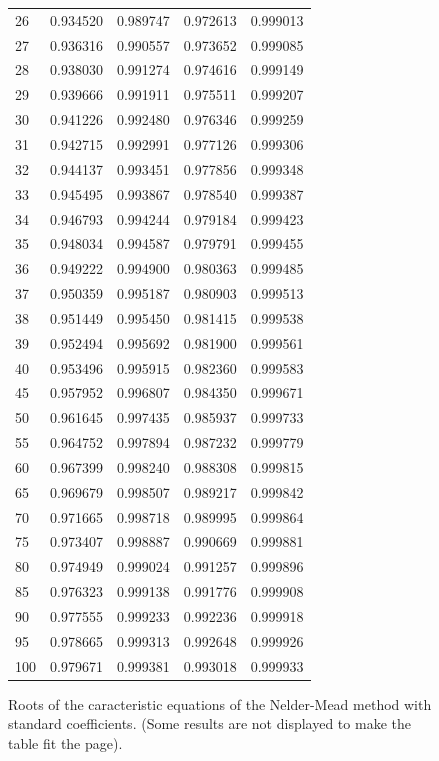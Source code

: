 \begin{figure}[htbp]
\begin{center}
\begin{tiny}
\begin{tabular}{|l|l||l|l|l|}
26 & 0.934520 & 0.989747 & 0.972613 & 0.999013\\
27 & 0.936316 & 0.990557 & 0.973652 & 0.999085\\
28 & 0.938030 & 0.991274 & 0.974616 & 0.999149\\
29 & 0.939666 & 0.991911 & 0.975511 & 0.999207\\
30 & 0.941226 & 0.992480 & 0.976346 & 0.999259\\
31 & 0.942715 & 0.992991 & 0.977126 & 0.999306\\
32 & 0.944137 & 0.993451 & 0.977856 & 0.999348\\
33 & 0.945495 & 0.993867 & 0.978540 & 0.999387\\
34 & 0.946793 & 0.994244 & 0.979184 & 0.999423\\
35 & 0.948034 & 0.994587 & 0.979791 & 0.999455\\
36 & 0.949222 & 0.994900 & 0.980363 & 0.999485\\
37 & 0.950359 & 0.995187 & 0.980903 & 0.999513\\
38 & 0.951449 & 0.995450 & 0.981415 & 0.999538\\
39 & 0.952494 & 0.995692 & 0.981900 & 0.999561\\
40 & 0.953496 & 0.995915 & 0.982360 & 0.999583\\
45 & 0.957952 & 0.996807 & 0.984350 & 0.999671\\
50 & 0.961645 & 0.997435 & 0.985937 & 0.999733\\
55 & 0.964752 & 0.997894 & 0.987232 & 0.999779\\
60 & 0.967399 & 0.998240 & 0.988308 & 0.999815\\
65 & 0.969679 & 0.998507 & 0.989217 & 0.999842\\
70 & 0.971665 & 0.998718 & 0.989995 & 0.999864\\
75 & 0.973407 & 0.998887 & 0.990669 & 0.999881\\
80 & 0.974949 & 0.999024 & 0.991257 & 0.999896\\
85 & 0.976323 & 0.999138 & 0.991776 & 0.999908\\
90 & 0.977555 & 0.999233 & 0.992236 & 0.999918\\
95 & 0.978665 & 0.999313 & 0.992648 & 0.999926\\
100 & 0.979671 & 0.999381 & 0.993018 & 0.999933\\
\hline
\end{tabular}
\end{tiny}
\end{center}
\caption{Roots of the caracteristic equations of the Nelder-Mead method with standard 
coefficients. (Some results are not displayed to make the table fit the page).}
\label{table-nm-roots-table}
\end{figure}

